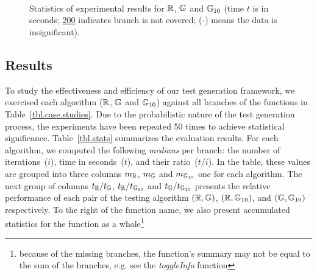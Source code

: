 \begin{figure*}[!t]
\centering
\begin{minipage}[c]{.43\linewidth}
\centering
{}\\
\\
\\
\begin{minipage}[c]{.6\linewidth}
\subfloat[Time $t$]{
  \centering
  
  \label{fig.gen.time.comp}
}
\end{minipage}
\hfill
\begin{minipage}[c]{.3\linewidth}
\subfloat[Speed $t/i$]{
  \centering
  
  \label{fig.get.cost}
}
\end{minipage}
\end{minipage}
\hfill
\begin{minipage}[c]{.55\linewidth}
\end{minipage}
\caption{Statistics of experimental results for $\mathbb{R}$, $\mathbb{G}$ and $\mathbb{G}_{10}$ (time $t$ is in seconds; \underline{200} indicates branch is not covered; (-) means the data is insignificant).}
\label{lab3}
\end{figure*}


\subsection{Results}
\label{sub.sec.eval.results}

To study the effectiveness and efficiency of our test generation framework, we exercised each algorithm ($\mathbb{R}$, $\mathbb{G}$ and $\mathbb{G}_{10}$) against all branches of the functions in Table~\ref{tbl.case.studies}. Due to the probabilistic nature of the test generation process, the experiments have been repeated 50 times to achieve statistical significance. Table~\ref{tbl.stats} summarizes the evaluation results. For each algorithm, we computed the following \emph{medians} per branch: the number of iterations~($i$), time in seconds~($t$), and their ratio~($t/i$). In the table, these values are grouped into three columns $m_{\mathbb{R}}$, $m_{\mathbb{G}}$ and $m_{\mathbb{G}_{10}}$ one for each algorithm. The next group of columns $t_{\mathbb{R}}/t_{\mathbb{G}}$, $t_{\mathbb{R}}/t_{\mathbb{G}_{10}}$ and $t_{\mathbb{G}}/t_{\mathbb{G}_{10}}$ presents the relative performance of each pair of the testing algorithm $(\mathbb{R},\mathbb{G})$, $(\mathbb{R},\mathbb{G}_{10})$, and $(\mathbb{G},\mathbb{G}_{10})$ respectively. To the right of the function name, we also present accumulated statistics for the function as a whole\footnote{because of the missing branches, the function's summary may not be equal to the sum of the branches, e.g. see the \emph{toggleInfo} function}

